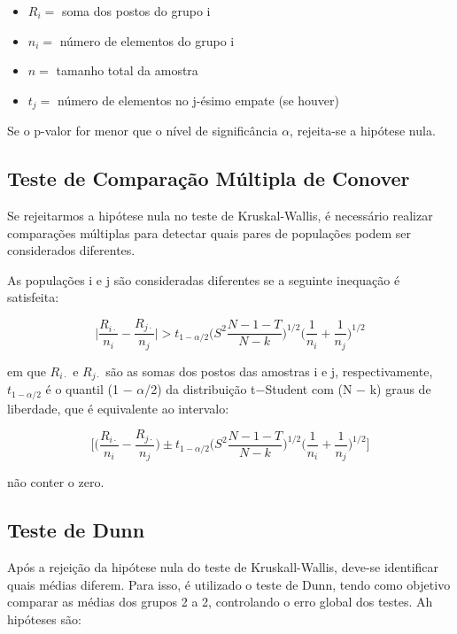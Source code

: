 \documentclass[
]{estat/estat}
\begin{document}
\begin{itemize}
\item
  \(R_i=\) soma dos postos do grupo i
\item
  \(n_i=\) número de elementos do grupo i
\item
  \(n=\) tamanho total da amostra
\item
  \(t_{j}=\) número de elementos no j-ésimo empate (se houver)
\end{itemize}

Se o p-valor for menor que o nível de significância \(\alpha\),
rejeita-se a hipótese nula.

\subsection{Teste de Comparação Múltipla de
Conover}\label{teste-de-comparauxe7uxe3o-muxfaltipla-de-conover}

Se rejeitarmos a hipótese nula no teste de Kruskal-Wallis, é necessário
realizar comparações múltiplas para detectar quais pares de populações
podem ser considerados diferentes.

As populações i e j são consideradas diferentes se a seguinte inequação
é satisfeita:

\[\bigg | \frac{R_{i\cdot}}{n_i} - \frac{R_{j\cdot}}{n_j} \bigg | > t_{1-\alpha/2} \bigg ( S^2 \frac{N-1-T}{N-k} \bigg ) ^{1/2} \bigg ( \frac{1}{n_i} + \frac{1}{n_j} \bigg )^{1/2}\]

em que \(R_{i\cdot}\) e \(R_{j\cdot}\) são as somas dos postos das
amostras i e j, respectivamente, \(t_{1−\alpha/2}\) é o quantil (1 −
\(\alpha\)/2) da distribuição t−Student com (N − k) graus de liberdade,
que é equivalente ao intervalo:

\[\bigg [ \bigg ( \frac{R_{i\cdot}}{n_i} - \frac{R_{j\cdot}}{n_j} \bigg )   \pm t_{1-\alpha/2} \bigg ( S^2 \frac{N-1-T}{N-k} \bigg ) ^{1/2} \bigg ( \frac{1}{n_i} + \frac{1}{n_j} \bigg )^{1/2} \bigg ]\]

não conter o zero.

\subsection{Teste de Dunn}\label{teste-de-dunn}

Após a rejeição da hipótese nula do teste de Kruskall-Wallis, deve-se
identificar quais médias diferem. Para isso, é utilizado o teste de
Dunn, tendo como objetivo comparar as médias dos grupos 2 a 2,
controlando o erro global dos testes. Ah hipóteses são:
\end{document}
